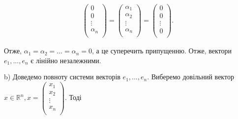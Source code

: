 \begin{example}
\begin{equation*}
\begin{split}
\begin{pmatrix}
                0  \\
                0  \\
                \vdots  \\
                \alpha_n  \\
            \end{pmatrix}
            = \begin{pmatrix}
                \alpha_1  \\
                \alpha_2  \\
                \vdots  \\
                \alpha_n  \\
            \end{pmatrix}
            = \begin{pmatrix}
                0  \\
                0  \\
                \vdots  \\
                0  \\
            \end{pmatrix}.
        \end{split}
    \end{equation*}
    
    Отже, $\alpha_1 = \alpha_2 = ... = \alpha_n = 0$, а це суперечить припущенню. Отже,
    вектори $e_1, ..., e_n$ є лінійно незалежними.
    
    b) Доведемо повноту системи векторів $e_1, ..., e_n$. Виберемо довільний вектор
    $x \in \mathbb{R}^n, x = \begin{pmatrix}
        x_1  \\
        x_2  \\
        \vdots  \\
        x_n  \\
    \end{pmatrix}$. Тоді


\end{example}
